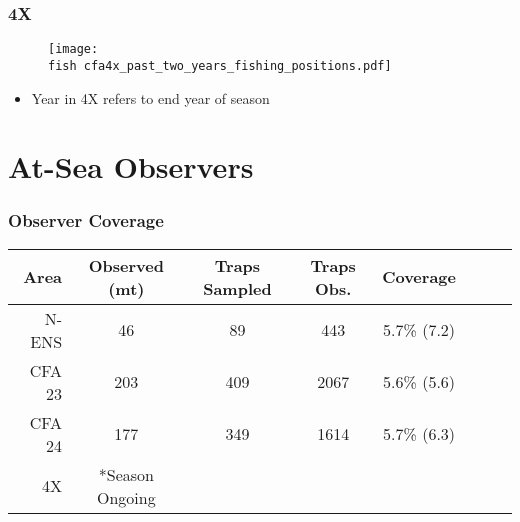 \documentclass{beamer}
\newcommand{\fish}{C:/Rsaves/fishery/2017/}
\begin{document}
\begin{frame}
	\frametitle{4X}
	\begin{figure}
		
		\vspace*{-1cm}
		\centerline{\texttt{[image: \\fish cfa4x\_past\_two\_years\_fishing\_positions.pdf]}}
		
	\end{figure}
	 \vspace*{-0.5cm}
	 \begin{itemize}
	 	\item Year in 4X refers to end year of season
	 \end{itemize}
\end{frame}

\section{At-Sea Observers}


\begin{frame}
\frametitle{Observer Coverage}

\begin{table}[ht]
\centering
\begin{tabular}{rcccclrr}
  \hline
 Area & Observed (mt) & Traps Sampled & Traps Obs. & Coverage \\ 
  \hline
N-ENS & 46 & 89 & 443 & 5.7\% (7.2)\\  
CFA 23 & 203 & 409 & 2067 & 5.6\% (5.6) \\ 
 CFA 24 & 177 & 349 & 1614 & 5.7\% (6.3)\\ 
 4X & *Season Ongoing&&&\\
   \hline
\end{tabular}

\end{table}


\end{frame}

\end{document}

